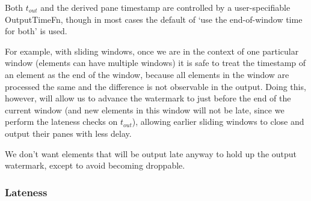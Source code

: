 \footnotetext
{
Both $t_{\mathit{out}}$ and the derived pane timestamp are controlled by a user-specifiable OutputTimeFn, though in most cases the default of `use the end-of-window time for both' is used.
}

For example, with sliding windows, once we are in the context of one particular window (elements can have multiple windows) it is safe to treat the timestamp of an element as the end of the window, because all elements in the window are processed the same and the difference is not observable in the output.
Doing this, however, will allow us to advance the watermark to just before the end of the current window (and new elements in this window will not be late, since we perform the lateness checks on $t_{\mathit{out}}$), allowing earlier sliding windows to close and output their panes with less delay.

We don't want elements that will be output late anyway to hold up the output watermark, except to avoid becoming droppable.


\subsubsection{Lateness}

